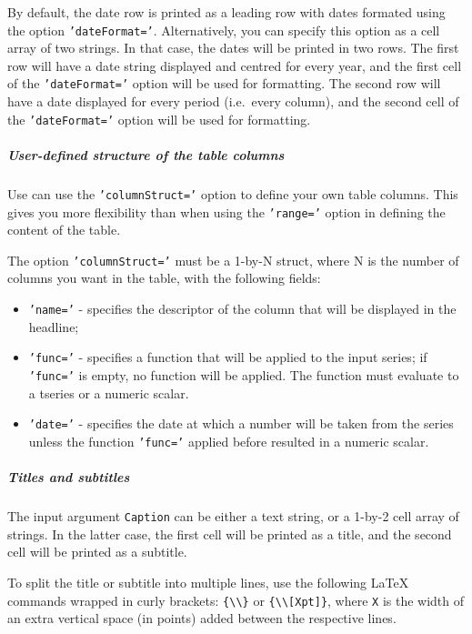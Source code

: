 By default, the date row is printed as a leading row with dates formated
using the option \texttt{'dateFormat='}. Alternatively, you can specify
this option as a cell array of two strings. In that case, the dates will
be printed in two rows. The first row will have a date string displayed
and centred for every year, and the first cell of the
\texttt{'dateFormat='} option will be used for formatting. The second
row will have a date displayed for every period (i.e.~every column), and
the second cell of the \texttt{'dateFormat='} option will be used for
formatting.

\subparagraph{User-defined structure of the table
columns}\label{user-defined-structure-of-the-table-columns}

Use can use the \texttt{'columnStruct='} option to define your own table
columns. This gives you more flexibility than when using the
\texttt{'range='} option in defining the content of the table.

The option \texttt{'columnStruct='} must be a 1-by-N struct, where N is
the number of columns you want in the table, with the following fields:

\begin{itemize}
\item
  \texttt{'name='} - specifies the descriptor of the column that will be
  displayed in the headline;
\item
  \texttt{'func='} - specifies a function that will be applied to the
  input series; if \texttt{'func='} is empty, no function will be
  applied. The function must evaluate to a tseries or a numeric scalar.
\item
  \texttt{'date='} - specifies the date at which a number will be taken
  from the series unless the function \texttt{'func='} applied before
  resulted in a numeric scalar.
\end{itemize}

\subparagraph{Titles and subtitles}\label{titles-and-subtitles}

The input argument \texttt{Caption} can be either a text string, or a
1-by-2 cell array of strings. In the latter case, the first cell will be
printed as a title, and the second cell will be printed as a subtitle.

To split the title or subtitle into multiple lines, use the following
LaTeX commands wrapped in curly brackets:
\texttt{\{\textbackslash{}\textbackslash{}\}} or
\texttt{\{\textbackslash{}\textbackslash{}{[}Xpt{]}\}}, where \texttt{X}
is the width of an extra vertical space (in points) added between the
respective lines.

